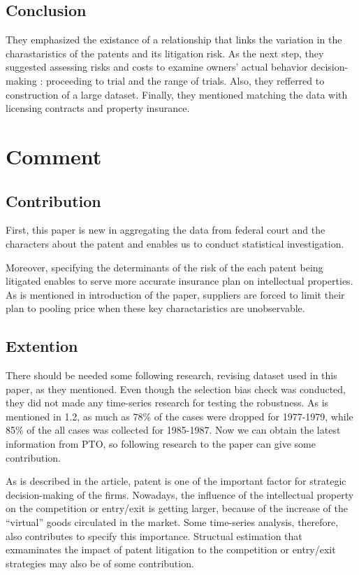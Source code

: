 \documentclass{jsarticle}[12pt]
\begin{document}
  \subsection{Conclusion}
  
  They emphasized the existance of a relationship that links the variation in the charastaristics of the patents and its litigation risk. As the next step, they suggested assessing risks and costs to examine owners' actual behavior decision-making : proceeding to trial and the range of trials. Also, they refferred to construction of a large dataset. Finally, they mentioned matching the data with licensing contracts and property insurance.
 
 \section{Comment}
 
 
 
  \subsection{Contribution}
  
  First, this paper is new in aggregating the data from federal court and the characters about the patent and enables us to conduct statistical investigation. 
  
  Moreover, specifying the determinants of the risk of the each patent being litigated enables to serve more accurate insurance plan on intellectual properties. As is mentioned in introduction of the paper, suppliers are forced to limit their plan to pooling price when these key charactaristics are unobservable.
  
  \subsection{Extention}
  
  There should be needed some following research, revising dataset used in this paper, as they mentioned. Even though the selection bias check was conducted, they did not made any time-series research for testing the robustness. As is mentioned in 1.2, as much as 78\% of the cases were dropped for 1977-1979, while 85\% of the all cases was collected for 1985-1987. Now we can obtain the latest information from PTO, so following research to the paper can give some contribution.
  
  As is described in the article, patent is one of the important factor for strategic decision-making of the firms. Nowadays, the influence of the intellectual property on the competition or entry/exit is getting larger, because of the increase of the ``virtual'' goods circulated in the market. Some time-series analysis, therefore, also contributes to specify this importance. Structual estimation that exmaminates the impact of patent litigation to the competition or entry/exit strategies may also be of some contribution.
\end{document}
